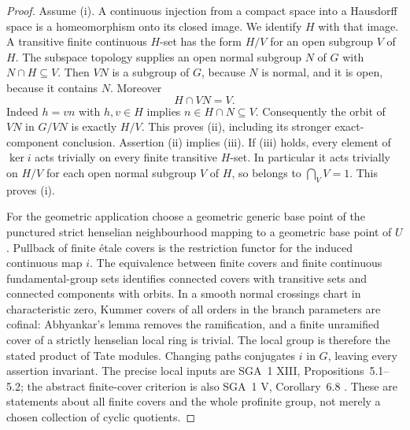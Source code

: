 \begin{proof}
Assume (i). A continuous injection from a compact space into a Hausdorff
space is a homeomorphism onto its closed image. We identify $H$ with
that image. A transitive finite continuous $H$-set has the form $H/V$
for an open subgroup $V$ of $H$. The subspace topology supplies an
open normal subgroup $N$ of $G$ with $N\cap H\subseteq V$.
Then $VN$ is a subgroup of $G$, because $N$ is normal, and it is open,
because it contains $N$. Moreover
\[
                    H\cap VN=V.
\]
Indeed $h=vn$ with $h,v\in H$ implies $n\in H\cap N\subseteq V$.
Consequently the orbit of $VN$ in $G/VN$ is exactly $H/V$.
This proves (ii), including its stronger exact-component conclusion.
Assertion (ii) implies (iii). If (iii) holds, every element of
$\ker i$ acts trivially on every finite transitive $H$-set. In
particular it acts trivially on $H/V$ for each open normal subgroup
$V$ of $H$, so belongs to $\bigcap_V V=1$. This proves (i).

For the geometric application choose a geometric generic base point
of the punctured strict henselian neighbourhood mapping to a geometric
base point of $U$. Pullback of finite \'etale covers is the restriction
functor for the induced continuous map $i$. The equivalence between
finite covers and finite continuous fundamental-group sets identifies
connected covers with transitive sets and connected components with
orbits. In a smooth normal crossings chart in characteristic zero,
Kummer covers of all orders in the branch parameters are cofinal:
Abhyankar's lemma removes the ramification, and a finite unramified
cover of a strictly henselian local ring is trivial. The local group
is therefore the stated product of Tate modules. Changing paths
conjugates $i$ in $G$, leaving every assertion invariant.
The precise local inputs are SGA~1 XIII, Propositions~5.1--5.2;
the abstract finite-cover criterion is also SGA~1 V, Corollary~6.8
\citep{E_SGA1}. These are statements about all finite covers and
the whole profinite group, not merely a chosen collection of cyclic
quotients.
\end{proof}

